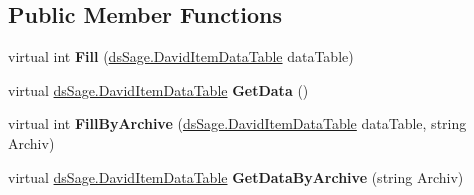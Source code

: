 \subsection*{Public Member Functions}
\begin{DoxyCompactItemize}
\item 
virtual int {\bfseries Fill} (\hyperlink{class_products_1_1_data_1_1ds_sage_1_1_david_item_data_table}{ds\+Sage.\+David\+Item\+Data\+Table} data\+Table)\hypertarget{class_products_1_1_data_1_1ds_sage_table_adapters_1_1ta_david_item_a4ed86f4301523ebaec481de179297ddb}{}\label{class_products_1_1_data_1_1ds_sage_table_adapters_1_1ta_david_item_a4ed86f4301523ebaec481de179297ddb}

\item 
virtual \hyperlink{class_products_1_1_data_1_1ds_sage_1_1_david_item_data_table}{ds\+Sage.\+David\+Item\+Data\+Table} {\bfseries Get\+Data} ()\hypertarget{class_products_1_1_data_1_1ds_sage_table_adapters_1_1ta_david_item_a6352412082ca84f3189d8b6cb0ba681c}{}\label{class_products_1_1_data_1_1ds_sage_table_adapters_1_1ta_david_item_a6352412082ca84f3189d8b6cb0ba681c}

\item 
virtual int {\bfseries Fill\+By\+Archive} (\hyperlink{class_products_1_1_data_1_1ds_sage_1_1_david_item_data_table}{ds\+Sage.\+David\+Item\+Data\+Table} data\+Table, string Archiv)\hypertarget{class_products_1_1_data_1_1ds_sage_table_adapters_1_1ta_david_item_a26a9e40b5a72c1fe976f2f2fabd0f78c}{}\label{class_products_1_1_data_1_1ds_sage_table_adapters_1_1ta_david_item_a26a9e40b5a72c1fe976f2f2fabd0f78c}

\item 
virtual \hyperlink{class_products_1_1_data_1_1ds_sage_1_1_david_item_data_table}{ds\+Sage.\+David\+Item\+Data\+Table} {\bfseries Get\+Data\+By\+Archive} (string Archiv)\hypertarget{class_products_1_1_data_1_1ds_sage_table_adapters_1_1ta_david_item_a4d90f39c28954003a52c957d531ace90}{}\label{class_products_1_1_data_1_1ds_sage_table_adapters_1_1ta_david_item_a4d90f39c28954003a52c957d531ace90}

\end{DoxyCompactItemize}
